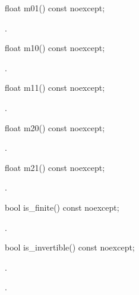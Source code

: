 %
\begin{itemdecl}
float m01() const noexcept;
\end{itemdecl}
\begin{itemdescr}
\pnum
\returns
{}.
\end{itemdescr}

%
\begin{itemdecl}
float m10() const noexcept;
\end{itemdecl}
\begin{itemdescr}
\pnum
\returns
{}.
\end{itemdescr}

%
\begin{itemdecl}
float m11() const noexcept;
\end{itemdecl}
\begin{itemdescr}
\pnum
\returns
{}.
\end{itemdescr}

%
\begin{itemdecl}
float m20() const noexcept;
\end{itemdecl}
\begin{itemdescr}
\pnum
\returns
{}.
\end{itemdescr}

%
\begin{itemdecl}
float m21() const noexcept;
\end{itemdecl}
\begin{itemdescr}
\pnum
\returns
{}.
\end{itemdescr}

%
\begin{itemdecl}
bool is_finite() const noexcept;
\end{itemdecl}
\begin{itemdescr}
\pnum
\returns
{}.
\end{itemdescr}

%
\begin{itemdecl}
bool is_invertible() const noexcept;
\end{itemdecl}
\begin{itemdescr}
\pnum
\requires
{}.

\pnum
\returns
{}.
\end{itemdescr}

